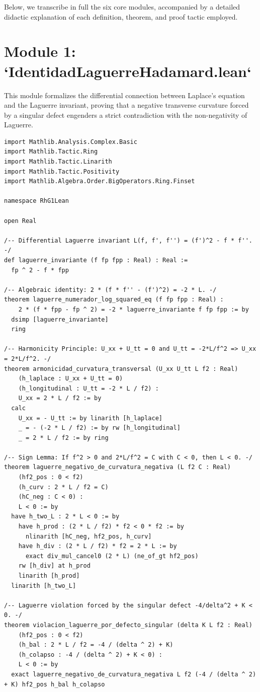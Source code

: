 \documentclass[11pt,a4paper]{article}
\theoremstyle{definition}
\theoremstyle{remark}
\begin{document}
Below, we transcribe in full the six core modules, accompanied by a detailed didactic explanation of each definition, theorem, and proof tactic employed.

\section{Module 1: `IdentidadLaguerreHadamard.lean`}

This module formalizes the differential connection between Laplace's equation and the Laguerre invariant, proving that a negative transverse curvature forced by a singular defect engenders a strict contradiction with the non-negativity of Laguerre.

\begin{lstlisting}[language=Lean4]
import Mathlib.Analysis.Complex.Basic
import Mathlib.Tactic.Ring
import Mathlib.Tactic.Linarith
import Mathlib.Tactic.Positivity
import Mathlib.Algebra.Order.BigOperators.Ring.Finset

namespace RhG1Lean

open Real

/-- Differential Laguerre invariant L(f, f', f'') = (f')^2 - f * f''. -/
def laguerre_invariante (f fp fpp : Real) : Real :=
  fp ^ 2 - f * fpp

/-- Algebraic identity: 2 * (f * f'' - (f')^2) = -2 * L. -/
theorem laguerre_numerador_log_squared_eq (f fp fpp : Real) :
    2 * (f * fpp - fp ^ 2) = -2 * laguerre_invariante f fp fpp := by
  dsimp [laguerre_invariante]
  ring

/-- Harmonicity Principle: U_xx + U_tt = 0 and U_tt = -2*L/f^2 => U_xx = 2*L/f^2. -/
theorem armonicidad_curvatura_transversal (U_xx U_tt L f2 : Real)
    (h_laplace : U_xx + U_tt = 0)
    (h_longitudinal : U_tt = -2 * L / f2) :
    U_xx = 2 * L / f2 := by
  calc
    U_xx = - U_tt := by linarith [h_laplace]
    _ = - (-2 * L / f2) := by rw [h_longitudinal]
    _ = 2 * L / f2 := by ring

/-- Sign Lemma: If f^2 > 0 and 2*L/f^2 = C with C < 0, then L < 0. -/
theorem laguerre_negativo_de_curvatura_negativa (L f2 C : Real)
    (hf2_pos : 0 < f2)
    (h_curv : 2 * L / f2 = C)
    (hC_neg : C < 0) :
    L < 0 := by
  have h_two_L : 2 * L < 0 := by
    have h_prod : (2 * L / f2) * f2 < 0 * f2 := by
      nlinarith [hC_neg, hf2_pos, h_curv]
    have h_div : (2 * L / f2) * f2 = 2 * L := by
      exact div_mul_cancel0 (2 * L) (ne_of_gt hf2_pos)
    rw [h_div] at h_prod
    linarith [h_prod]
  linarith [h_two_L]

/-- Laguerre violation forced by the singular defect -4/delta^2 + K < 0. -/
theorem violacion_laguerre_por_defecto_singular (delta K L f2 : Real)
    (hf2_pos : 0 < f2)
    (h_bal : 2 * L / f2 = -4 / (delta ^ 2) + K)
    (h_colapso : -4 / (delta ^ 2) + K < 0) :
    L < 0 := by
  exact laguerre_negativo_de_curvatura_negativa L f2 (-4 / (delta ^ 2) + K) hf2_pos h_bal h_colapso


\end{lstlisting}
\end{document}
